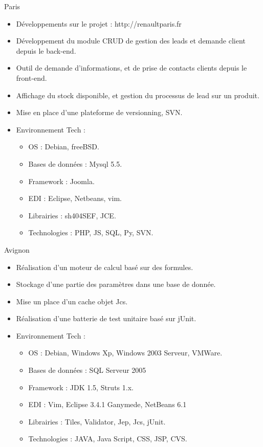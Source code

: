 \documentclass[10pt,a4paper,sans]{moderncv}
\begin{document}
{Paris}{
  \begin{itemize}%
    \item Développements sur le projet : http://renaultparis.fr
    \item Développement du module CRUD de gestion des leads et demande client depuis le back-end.
    \item Outil de demande d'informations, et de prise de contacts clients depuis le front-end.
    \item Affichage du stock disponible, et gestion du processus de lead sur un produit.
    \item Mise en place d'une plateforme de versionning, SVN.
    \item Environnement Tech :
      \begin{itemize}%
        \item OS : Debian, freeBSD.
        \item Bases de données : Mysql 5.5.
        \item Framework : Joomla.
        \item EDI : Eclipse, Netbeans, vim.
        \item Librairies : sh404SEF, JCE.
        \item Technologies : PHP, JS, SQL, Py, SVN.
      \end{itemize}
  \end{itemize}}

{Avignon}{
  \begin{itemize}%
    \item Réalisation d'un moteur de calcul basé sur des formules.
    \item Stockage d'une partie des paramètres dans une base de donnée.
    \item Mise un place d'un cache objet Jcs.
    \item Réalisation d'une batterie de test unitaire basé sur jUnit.
    \item Environnement Tech :
      \begin{itemize}%
        \item OS : Debian, Windows Xp, Windows 2003 Serveur, VMWare.
        \item Bases de données : SQL Serveur 2005
        \item Framework : JDK 1.5,  Struts 1.x.
        \item EDI : Vim, Eclipse 3.4.1 Ganymede, NetBeans 6.1
        \item Librairies : Tiles, Validator, Jep, Jcs, jUnit.
        \item Technologies : JAVA, Java Script, CSS, JSP, CVS.
      \end{itemize}
  \end{itemize}}
\end{document}

